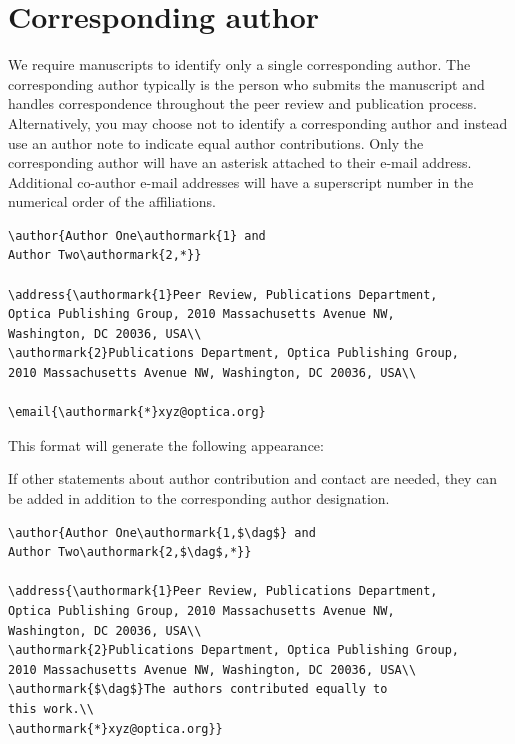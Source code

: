 \documentclass{optica-article}
\begin{document}
\section{Corresponding author}

We require manuscripts to identify only a single corresponding author. The corresponding author typically is the person who submits the manuscript and handles correspondence throughout the peer review and publication process. Alternatively, you may choose not to identify a corresponding author and instead use an author note to indicate equal author contributions. Only the corresponding author will have an asterisk attached to their e-mail address. Additional co-author e-mail addresses will have a superscript number in the numerical order of the affiliations. 

\begin{verbatim}
\author{Author One\authormark{1} and 
Author Two\authormark{2,*}}

\address{\authormark{1}Peer Review, Publications Department,
Optica Publishing Group, 2010 Massachusetts Avenue NW,
Washington, DC 20036, USA\\
\authormark{2}Publications Department, Optica Publishing Group,
2010 Massachusetts Avenue NW, Washington, DC 20036, USA\\

\email{\authormark{*}xyz@optica.org}
\end{verbatim}

This format will generate the following appearance:  

\bigskip

\author{Author One and Author Two}

\address{Peer Review, Publications Department,
Optica Publishing Group, 2010 Massachusetts Avenue NW,
Washington, DC 20036, USA\\
Publications Department, Optica Publishing Group,
2010 Massachusetts Avenue NW, Washington, DC 20036, USA\\

}

\medskip

If other statements about author contribution and contact are needed, they can be added in addition to the corresponding author designation.
\begin{verbatim}
\author{Author One\authormark{1,$\dag$} and 
Author Two\authormark{2,$\dag$,*}}

\address{\authormark{1}Peer Review, Publications Department,
Optica Publishing Group, 2010 Massachusetts Avenue NW,
Washington, DC 20036, USA\\
\authormark{2}Publications Department, Optica Publishing Group,
2010 Massachusetts Avenue NW, Washington, DC 20036, USA\\
\authormark{$\dag$}The authors contributed equally to
this work.\\
\authormark{*}xyz@optica.org}}
\end{verbatim}
\end{document}
